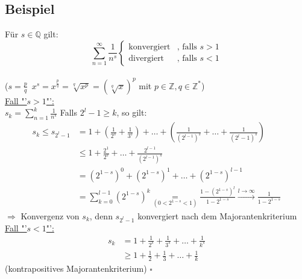 \subsection{Beispiel} %
\label{sub:beispiel}
Für $s \in \mathds{Q}$ gilt:
\[
	\sum\limits_{n=1}^{\infty} \frac{1}{n^s} \begin{cases}
		\text{konvergiert} &\text{, falls } s>1 \\
		\text{divergiert} &\text{, falls } s<1
	\end{cases}
\]
\vspace{6pt} \\
{\small ($s=\frac{p}{q} \enspace x^s= x^{\frac{p}{q}} = \sqrt[q]{x^p} 
= (\sqrt[q]{x})^p$ mit $p \in \mathds{Z}, q \in \mathds{Z}^*$)}
\vspace{\baselineskip} \\
\underline{Fall "'$s>1$"':} \\
$s_k = \sum\limits_{n=1}^{k} \frac{1}{n^s} $ Falls $2^l -1 \geq k$, so gilt: 
\begin{align*}
	s_k \leq s_{2^l -1} &= 1+ \left( \frac{1}{2^s} + \frac{1}{3^s} \right) +\ldots 
	+ \left( \frac{1}{(2^{l-1})^s} + \ldots + \frac{1}{(2^l -1)^s}\right) \\
	&\leq 1 + \frac{2^1}{2^s} + \ldots + \frac{2^{l-1}}{(2^{l-1})^s}  \tag{Vertau. d. Prod. im Expon.}\\
	&= (2^{1-s})^0 + (2^{1-s})^1 + \ldots + (2^{1-s})^{l-1} \\
	&= \sum\limits_{k=0}^{l-1}  (2^{1-s})^k \underset{(0<2^{1-s}<1)}{=} \frac{1-(2^{1-s})^l}{1-2^{1-s}} 
	\xrightarrow{l \to \infty} \frac{1}{1-2^{1-s}}
\end{align*}
$\Rightarrow$ Konvergenz von $s_k$, denn $s_{2^l -1}$ konvergiert nach dem Majorantenkriterium
\vspace{\baselineskip} \\
\underline{Fall "'$s<1$"':} \\
\begin{align*}
	s_k &= 1 + \frac{1}{2^s} + \frac{1}{3^s} + \ldots + \frac{1}{k^s} \\
	&\geq 1 + \frac{1}{2} +\frac{1}{3} + \ldots + \frac{1}{k} \tag{harmonische Reihe $\to$ divergiert}
\end{align*}
(kontrapositives Majorantenkriterium) \hfill $\square$ 

